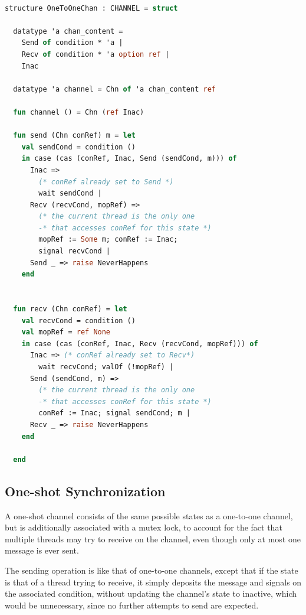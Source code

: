 \documentclass[10pt]{article}
\begin{document}
\begin{lstlisting}[language=ML, mathescape]

structure OneToOneChan : CHANNEL = struct

  datatype 'a chan_content =
    Send of condition * 'a |
    Recv of condition * 'a option ref |
    Inac  

  datatype 'a channel = Chn of 'a chan_content ref

  fun channel () = Chn (ref Inac)

  fun send (Chn conRef) m = let
    val sendCond = condition ()
    in case (cas (conRef, Inac, Send (sendCond, m))) of
      Inac => 
        (* conRef already set to Send *)
        wait sendCond |
      Recv (recvCond, mopRef) =>
        (* the current thread is the only one
        -* that accesses conRef for this state *)
        mopRef := Some m; conRef := Inac;
        signal recvCond |
      Send _ => raise NeverHappens
    end


  fun recv (Chn conRef) = let
    val recvCond = condition ()
    val mopRef = ref None
    in case (cas (conRef, Inac, Recv (recvCond, mopRef))) of
      Inac => (* conRef already set to Recv*)
        wait recvCond; valOf (!mopRef) |
      Send (sendCond, m) =>
        (* the current thread is the only one
        -* that accesses conRef for this state *)
        conRef := Inac; signal sendCond; m |
      Recv _ => raise NeverHappens
    end 

  end
  \end{lstlisting}

\subsection{One-shot Synchronization}

A one-shot channel consists of the same possible states as a one-to-one channel, but is
additionally associated with a mutex lock, to account for the fact that multiple threads may
try to receive on the channel, even though only at most one message is ever sent.

The sending operation is like that of one-to-one channels,
except that if the state is that of a
thread trying to receive, it simply deposits the message and signals on the associated
condition, without updating the channel's state to inactive, which would be unnecessary, since
no further attempts to send are expected.
\end{document}
